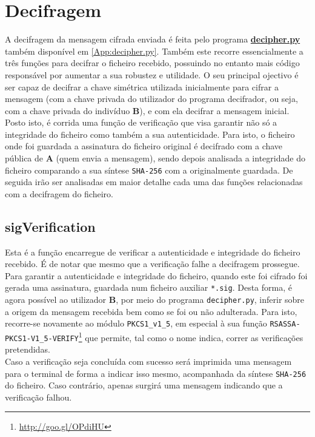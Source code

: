 \documentclass[a4paper,11pt,openright,oneside]{report}
\begin{document}
\section{Decifragem}

A decifragem da mensagem cifrada enviada é feita pelo programa \href{../Python/Receiver/decipher.py}{\textbf{de\-ci\-pher.py}} também disponível em \ref{App:decipher.py}. Também este recorre essencialmente a três funções para decifrar o ficheiro recebido, possuindo no entanto mais código responsável por aumentar a sua robustez e utilidade. O seu principal ojectivo é ser capaz de decifrar a chave simétrica utilizada inicialmente para cifrar a mensagem (com a chave privada do utilizador do programa decifrador, ou seja, com a chave privada do indivíduo \textbf{B}), e com ela decifrar a mensagem inicial. Posto isto, é corrida uma função de verificação que visa garantir não só a integridade do ficheiro como também a sua autenticidade. Para isto, o ficheiro onde foi guardada a assinatura do ficheiro original é decifrado com a chave pública de \textbf{A} (quem envia a mensagem), sendo depois analisada a integridade do ficheiro comparando a sua síntese \verb|SHA-256| com a originalmente guardada. De seguida irão ser analisadas em maior detalhe cada uma das funções relacionadas com a decifragem do ficheiro.

\subsection{sigVerification}

Esta é a função encarregue de verificar a autenticidade e integridade do ficheiro recebido. É de notar que mesmo que a verificação falhe a decifragem prossegue.\\

Para garantir a autenticidade e integridade do ficheiro, quando este foi cifrado foi gerada uma assinatura, guardada num ficheiro auxiliar \verb|*.sig|. Desta forma, é agora possível ao utilizador \textbf{B}, por meio do programa \verb|decipher.py|, inferir sobre a origem da mensagem recebida bem como se foi ou não adulterada. Para isto, recorre-se novamente ao módulo \verb|PKCS1_v1_5|, em especial à sua função \verb|RSASSA-PKCS1-V1_5-VERIFY|\footnote{\url{http://goo.gl/OPdiHU}} que permite, tal como o nome indica, correr as verificações pretendidas.\\

Caso a verificação seja concluída com sucesso será imprimida uma mensagem para o terminal de forma a indicar isso mesmo, acompanhada da síntese \verb|SHA-256| do ficheiro. Caso contrário, apenas surgirá uma mensagem indicando que a verificação falhou.
\end{document}
